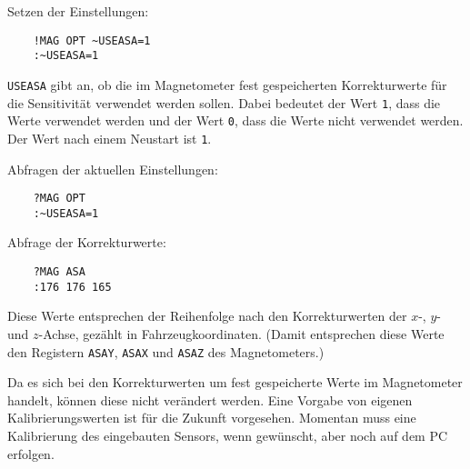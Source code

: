 Setzen der Einstellungen:
\begin{verbatim}
	!MAG OPT ~USEASA=1
	:~USEASA=1
\end{verbatim}

\verb|USEASA| gibt an, ob die im Magnetometer fest gespeicherten Korrekturwerte für die Sensitivität verwendet werden sollen. Dabei bedeutet der Wert \verb|1|, dass die Werte verwendet werden und der Wert \verb|0|, dass die Werte nicht verwendet werden. Der Wert nach einem Neustart ist \verb|1|.

Abfragen der aktuellen Einstellungen:
\begin{verbatim}
	?MAG OPT
	:~USEASA=1
\end{verbatim}

Abfrage der Korrekturwerte:
\begin{verbatim}
	?MAG ASA
	:176 176 165
\end{verbatim}
Diese Werte entsprechen der Reihenfolge nach den Korrekturwerten der $x$-, $y$- und $z$-Achse, gezählt in Fahrzeugkoordinaten. (Damit entsprechen diese Werte den Registern \verb|ASAY|, \verb|ASAX| und \verb|ASAZ| des Magnetometers.)

Da es sich bei den Korrekturwerten um fest gespeicherte Werte im Magnetometer handelt, können diese nicht verändert werden. {\color[rgb]{0.75,0.75,0.75} Eine Vorgabe von eigenen Kalibrierungswerten ist für die Zukunft vorgesehen. Momentan muss eine Kalibrierung des eingebauten Sensors, wenn gewünscht, aber noch auf dem PC erfolgen.}


